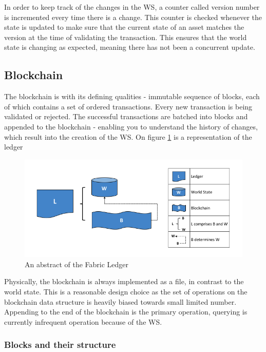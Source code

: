 \documentclass[a4paper,11pt]{report}
\begin{document}
In order to keep track of the changes in the WS, a counter called version number is incremented every time there is a change. This counter is checked whenever the state is updated to make sure that the current state of an asset matches the version at the time of validating the transaction. This ensures that the world state is changing as expected, meaning there has not been a concurrent update. \cite{fabledger}

\subsection{Blockchain}

The blockchain is with its defining qualities - immutable sequence of blocks, each of which contains a set of ordered transactions. Every new transaction is being validated or rejected. The successful transactions are batched into blocks and appended to the blockchain - enabling you to understand the history of changes, which result into the creation of the WS. On figure \ref{fabricLedger} is a representation of the ledger

\begin{figure}[h]
\centering
  \includegraphics[width=16cm]{ledgerdiagram1.png}
  \caption{An abstract of the Fabric Ledger \cite{fabledger}}
  \label{fabricLedger}
\end{figure}

Physically, the blockchain is always implemented as a file, in contrast to the world state. This is a reasonable design choice as the set of operations on the blockchain data structure is heavily biased towards small limited number. Appending to the end of the blockchain is the primary operation, querying is currently infrequent operation because of the WS. 

\subsubsection{Blocks and their structure}
\end{document}

